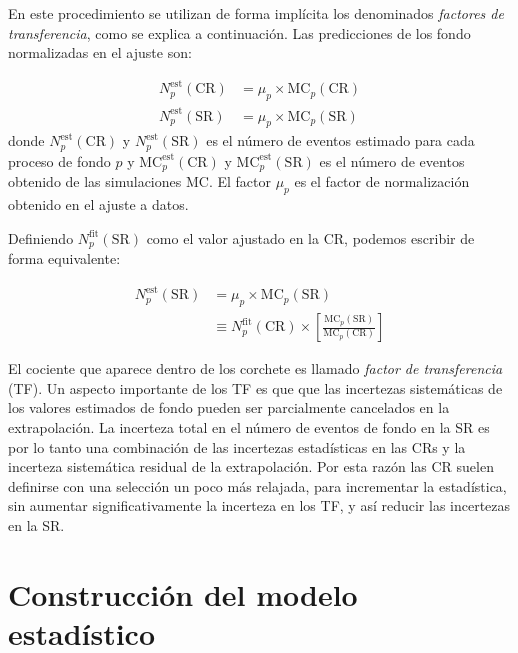 En este procedimiento se utilizan de forma implícita los
denominados \emph{factores de transferencia}, como se explica a continuación.
Las predicciones de los fondo normalizadas en el ajuste son:

\begin{align}
  N_p^{\text{est}}(\text{CR}) &= \mu_p \times \text{MC}_p (\text{CR})
  \\ N_p^{\text{est}}(\text{SR}) &= \mu_p \times \text{MC}_p (\text{SR})
\end{align}
%
donde $N_p^{\text{est}}(\text{CR})$ y $N_p^{\text{est}}(\text{SR})$ es el número
de eventos estimado para cada proceso de fondo $p$ y
$\text{MC}_p^{\text{est}}(\text{CR})$ y $\text{MC}_p^{\text{est}}(\text{SR})$ es
el número de eventos obtenido de las simulaciones MC. El factor $\mu_p$ es el
factor de normalización obtenido en el ajuste a datos.


Definiendo $N_p^\text{fit}(\text{SR})$ como el valor ajustado en la CR, podemos
escribir de forma equivalente:

\begin{align}
  N_p^\text{est}(\text{SR}) &= \mu_p \times \text{MC}_p (\text{SR}) \nonumber \\
  &\equiv N_p^\text{fit}(\text{CR}) \times \left[ \frac{\text{MC}_p(\text{SR})}{\text{MC}_p(\text{CR})} \right]
\end{align}

El cociente que aparece dentro de los corchete es llamado \emph{factor de
  transferencia} (TF). Un aspecto importante de los TF es que que las incertezas
sistemáticas de los valores estimados de fondo pueden ser parcialmente
cancelados en la extrapolación. La incerteza total en el número de eventos de
fondo en la SR es por lo tanto una combinación de las incertezas estadísticas en
las CRs y la incerteza sistemática residual de la extrapolación. Por esta razón
las CR suelen definirse con una selección un poco más relajada, para incrementar
la estadística, sin aumentar significativamente la incerteza en los TF, y así
reducir las incertezas en la SR.


\section{Construcción del modelo estadístico}


